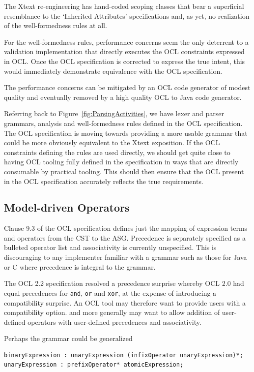 \documentclass{eceasst}
\begin{document}
The Xtext re-engineering has hand-coded scoping classes that bear a superficial resemblance to the `Inherited Attributes' specifications and, as yet, no realization of the well-formedness rules at all.

For the well-formedness rules, performance concerns seem the only deterrent to a validation implementation that directly executes the OCL constraints expressed in OCL. Once the OCL specification is corrected to express the true intent, this would immediately demonstrate equivalence with the OCL specification.

The performance concerns can be mitigated by an OCL code generator of modest quality and eventually removed by a high quality OCL to Java code generator.

Referring back to Figure~\ref{fig:ParsingActivities}, we have lexer and parser grammars, analysis and well-formedness rules defined in the OCL specification. The OCL specification is moving towards providing a more usable grammar that could be more obviously equivalent to the Xtext exposition. If the OCL constraints defining the rules are used directly, we should get quite close to having OCL tooling fully defined in the specification in ways that are directly consumable by practical tooling. This should then ensure that the OCL present in the OCL specification accurately reflects the true requirements.

\subsection{Model-driven Operators}

Clause 9.3 of the OCL specification defines just the mapping of expression terms and operators from the CST to the ASG. Precedence is separately specified as a bulleted operator list and associativity is currently unspecified. This is discouraging to any implementer familiar with a grammar such as those for Java or C where precedence is integral to the grammar.

The OCL 2.2 specification resolved a precedence surprise whereby OCL 2.0 had equal precedences for \verb+and+, \verb+or+ and \verb+xor+, at the expense of introducing a compatibility surprise. An OCL tool may therefore want to provide users with a compatibility option. and more generally may want to allow addition of user-defined operators with user-defined precedences and associativity.

Perhaps the grammar could be generalized

{\small\begin{verbatim}
binaryExpression : unaryExpression (infixOperator unaryExpression)*;
unaryExpression : prefixOperator* atomicExpression;
\end{verbatim}}
 
\end{document}
